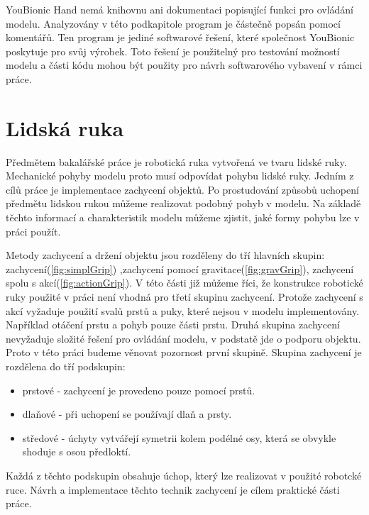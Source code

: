 \documentclass[thesis=B,czech]{FITthesis}[2012/06/26]
\begin{document}
YouBionic Hand nemá knihovnu ani dokumentaci popisující funkci pro ovládání modelu. Analyzovány v této podkapitole program je částečně popsán pomocí komentářů. Ten program je jediné softwarové řešení, které společnost YouBionic poskytuje pro svůj výrobek. Toto řešení je použitelný pro testování možností modelu a části kódu mohou být použity pro návrh softwarového vybavení v rámci práce.


\section{Lidská ruka}
\label{sec:hand}
Předmětem bakalářské práce je robotická ruka vytvořená ve tvaru lidské ruky. Mechanické pohyby modelu proto musí odpovídat pohybu lidské ruky. Jedním z cílů práce je implementace zachycení objektů. Po prostudování způsobů uchopení předmětu lidskou rukou můžeme realizovat podobný pohyb v modelu. Na základě těchto informací a charakteristik modelu můžeme zjistit, jaké formy pohybu lze v práci použít.


Metody zachycení a držení objektu jsou rozděleny do tří hlavních skupin: zachycení(\ref{fig:simplGrip}) ,zachycení pomocí gravitace(\ref{fig:gravGrip}), zachycení spolu s akcí(\ref{fig:actionGrip}). V této části již můžeme říci, že konstrukce robotické ruky použité v práci není vhodná pro třetí skupinu zachycení. Protože zachycení s akcí vyžaduje použití svalů prstů a puky, které nejsou v modelu implementovány. Například otáčení prstu a pohyb pouze části prstu. Druhá skupina zachycení nevyžaduje složité řešení pro ovládání modelu, v podstatě jde o podporu objektu. Proto v této práci budeme věnovat pozornost první skupině. Skupina zachycení je rozdělena do tří podskupin\cite{PhysJoin}:

\begin{itemize}
\item prstové - zachycení je provedeno pouze pomocí prstů.
\item dlaňové - při uchopení se používají dlaň a prsty.
\item středové -  úchyty vytvářejí symetrii kolem podélné osy, která se obvykle shoduje s osou předloktí.
\end{itemize}


Každá z těchto podskupin obsahuje úchop, který lze realizovat v použité robotcké ruce. Návrh a implementace těchto technik zachycení je cílem praktické části práce.

 
 
\end{document}
